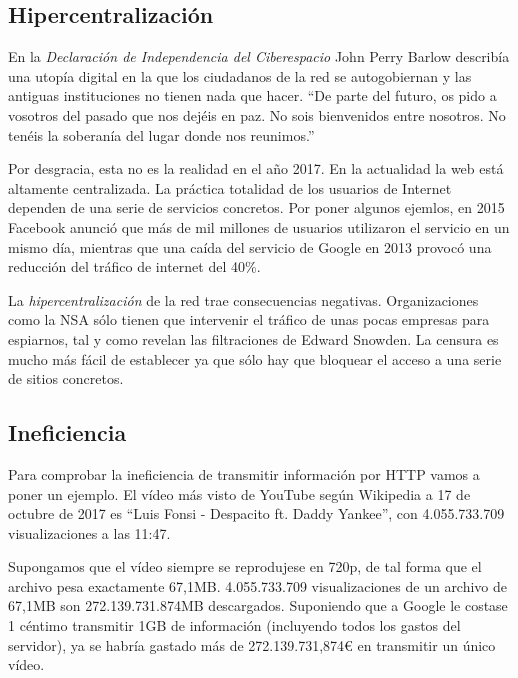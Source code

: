 \documentclass[12pt]{article} %
\begin{document}

\subsection{Hipercentralización} %
\label{sub:hipercentralización}

En la \textit{Declaración de Independencia del Ciberespacio}\cite{cyberspace-independence} John Perry Barlow describía una utopía digital en la que los ciudadanos de la red se autogobiernan y las antiguas instituciones no tienen nada que hacer. ``De parte del futuro, os pido a vosotros del pasado que nos dejéis en paz. No sois bienvenidos entre nosotros. No tenéis la soberanía del lugar donde nos reunimos.'' 

Por desgracia, esta no es la realidad en el año 2017. En la actualidad la web está altamente centralizada. La práctica totalidad de los usuarios de Internet dependen de una serie de servicios concretos. Por poner algunos ejemlos, en 2015 Facebook anunció que más de mil millones de usuarios utilizaron el servicio en un mismo día\cite{billion-facebook}, mientras que una caída del servicio de Google en 2013 provocó una reducción del tráfico de internet del 40\%\cite{google-outage}.

La \textit{hipercentralización} de la red trae consecuencias negativas. Organizaciones como la NSA sólo tienen que intervenir el tráfico de unas pocas empresas para espiarnos, tal y como revelan las filtraciones de Edward Snowden\cite{snowden-leaks}. La censura es mucho más fácil de establecer ya que sólo hay que bloquear el acceso a una serie de sitios concretos. 


\subsection{Ineficiencia} %
\label{sub:ineficiencia}

Para comprobar la ineficiencia de transmitir información por HTTP vamos a poner un ejemplo. El vídeo más visto de YouTube según Wikipedia a 17 de octubre de 2017 es ``Luis Fonsi - Despacito ft. Daddy Yankee''\cite{most-viewed-yt}, con 4.055.733.709 visualizaciones a las 11:47.

Supongamos que el vídeo siempre se reprodujese en 720p, de tal forma que el archivo pesa exactamente 67,1MB. 4.055.733.709 visualizaciones de un archivo de 67,1MB son 272.139.731.874MB descargados. Suponiendo que a Google le costase 1 céntimo transmitir 1GB de información (incluyendo todos los gastos del servidor), ya se habría gastado más de 
272.139.731,874€ en transmitir un único vídeo.
\end{document}

